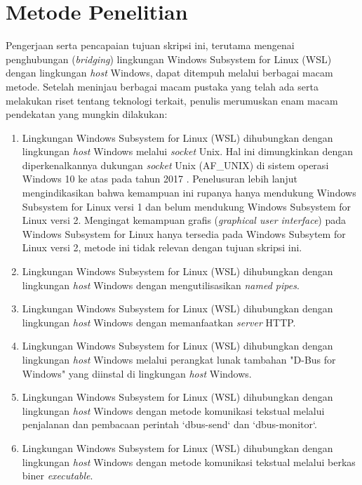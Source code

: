\chapter{Metode Penelitian}

Pengerjaan serta pencapaian tujuan skripsi ini, terutama mengenai penghubungan (\textit{bridging}) lingkungan Windows Subsystem for Linux (WSL) dengan lingkungan \textit{host} Windows, dapat ditempuh melalui berbagai macam metode. Setelah meninjau berbagai macam pustaka yang telah ada serta melakukan riset tentang teknologi terkait, penulis merumuskan enam macam pendekatan yang mungkin dilakukan:
\begin{enumerate}
    \item Lingkungan Windows Subsystem for Linux (WSL) dihubungkan dengan lingkungan \textit{host} Windows melalui \textit{socket} Unix. Hal ini dimungkinkan dengan diperkenalkannya dukungan \textit{socket} Unix (AF\_UNIX) di sistem operasi Windows 10 ke atas pada tahun 2017 \cite{bringing-afunix-to-windows}. Penelusuran lebih lanjut mengindikasikan bahwa kemampuan ini rupanya hanya mendukung Windows Subsystem for Linux versi 1 dan belum mendukung Windows Subsystem for Linux versi 2. Mengingat kemampuan grafis (\textit{graphical user interface}) pada Windows Subsystem for Linux hanya tersedia pada Windows Subsytem for Linux versi 2, metode ini tidak relevan dengan tujuan skripsi ini.
    \item Lingkungan Windows Subsystem for Linux (WSL) dihubungkan dengan lingkungan \textit{host} Windows dengan mengutilisasikan \textit{named pipes}.
    \item Lingkungan Windows Subsystem for Linux (WSL) dihubungkan dengan lingkungan \textit{host} Windows dengan memanfaatkan \textit{server} HTTP.
    \item Lingkungan Windows Subsystem for Linux (WSL) dihubungkan dengan lingkungan \textit{host} Windows melalui perangkat lunak tambahan "D-Bus for Windows" yang diinstal di lingkungan \textit{host} Windows.
    \item Lingkungan Windows Subsystem for Linux (WSL) dihubungkan dengan lingkungan \textit{host} Windows dengan metode komunikasi tekstual melalui penjalanan dan pembacaan perintah `dbus-send` dan `dbus-monitor`.
    \item Lingkungan Windows Subsystem for Linux (WSL) dihubungkan dengan lingkungan \textit{host} Windows dengan metode komunikasi tekstual melalui berkas biner \textit{executable}.
\end{enumerate}

